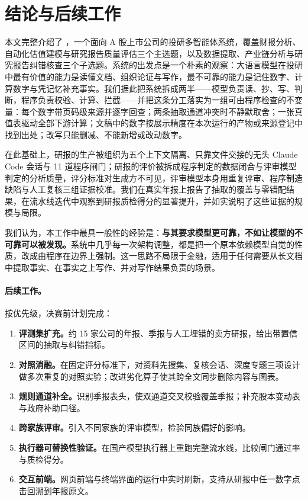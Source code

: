 \section{结论与后续工作}
\label{sec:conclusion}

本文完整介绍了 \sysname{}，一个面向 A 股上市公司的投研多智能体系统，覆盖财报分析、自动化估值建模与研究报告质量评估三个主选题，以及数据提取、产业链分析与研究报告纠错核查三个子选题。系统的出发点是一个朴素的观察：大语言模型在投研中最有价值的能力是读懂文档、组织论证与写作，最不可靠的能力是记住数字、计算数字与凭记忆补充事实。我们据此把系统拆成两半——模型负责读、抄、写、判断，程序负责校验、计算、拦截——并把这条分工落实为一组可由程序检查的不变量：每个数字带页码级来源并逐字回查；两条抽取通道冲突时不静默取舍；一张真值表驱动全部下游计算；文稿中的数字按展示精度在本次运行的产物或来源登记中找到出处；改写只能删减、不能新增或改动数字。

在此基础上，研报的生产被组织为五个上下文隔离、只靠文件交接的无头 Claude Code 会话与 11 道程序闸门；研报的评价被拆成程序判定的数据闭合与评审模型判定的分析质量，评分标准对生成方不可见，评审模型本身用重复评审、程序制造缺陷与人工复核三组证据校准。我们在真实年报上报告了抽取的覆盖与零错配结果，在流水线迭代中观察到研报质检得分的显著提升，并如实说明了这些证据的规模与局限。

我们认为，本工作中最具一般性的经验是：\textbf{与其要求模型更可靠，不如让模型的不可靠可以被发现。}系统中几乎每一次架构调整，都是把一个原本依赖模型自觉的性质，改成由程序在边界上强制。这一思路不局限于金融，适用于任何需要从长文档中提取事实、在事实之上写作、并对写作结果负责的场景。

\paragraph{后续工作。}按优先级，决赛前计划完成：
\begin{enumerate}
  \item \textbf{评测集扩充。}约 15 家公司的年报、季报与人工埋错的卖方研报，给出带置信区间的抽取与纠错指标。
  \item \textbf{对照消融。}在固定评分标准下，对资料先搜集、复核会话、深度专题三项设计做多次重复的对照实验；改进劣化算子使其跨全文同步删除内容与图表。
  \item \textbf{规则通道补全。}识别季报表头，使双通道交叉校验覆盖季报；补充股本变动表与政府补助口径。
  \item \textbf{跨家族评审。}引入不同家族的评审模型，检验同族偏好的影响。
  \item \textbf{执行器可替换性验证。}在国产模型执行器上重跑完整流水线，比较闸门通过率与质检得分。
  \item \textbf{交互前端。}网页前端与终端界面的运行中实时刷新，支持从研报中任一数字点击回溯到年报原文。
\end{enumerate}
